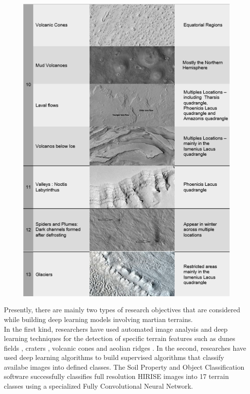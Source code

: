 \documentclass[project-plan]{report-template}
\begin{document}
\begin{figure}[htp]
    \begin{center}
        \includegraphics[width=1\textwidth]{table-1-part-3.png}
    \end{center}
\end{figure}

Presently, there are mainly two types of research objectives that are considered while building deep learning models involving martian terrains. \\
In the first kind, researchers have used automated image analysis and deep learning techniques for the detection of specific terrain features such as dunes fields \citep{5692810}, craters \citep{Lee_2019,palafox2015automated}, volcanic cones \citep{palafox2015automated} and aeolian ridges \citep{palafox2017automated}. 
In the second, researches have used deep learning algorithms to build supervised algorithms that classify availabe images into defined classes. The Soil Property and Object Classification \citep{Rothrock2016SPOCDL} software  successfully classifies full resolution HIRISE images into 17 terrain classes using a specialized Fully Convolutional Neural Network.
\end{document}
